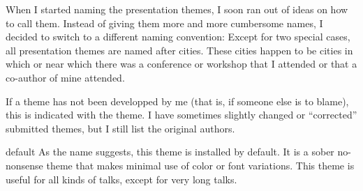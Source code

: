 When I started naming the presentation themes, I soon ran out of ideas on how to call them. Instead of giving them more and more cumbersome names, I decided to switch to a different naming convention: Except for two special cases, all presentation themes are named after cities. These cities happen to be cities in which or near which there was a conference or workshop that I attended or that a co-author of mine attended.

If a theme has not been developped by me (that is, if someone else is to blame), this is indicated with the theme. I have sometimes slightly changed or ``corrected'' submitted themes, but I still list the original authors.

\begin{themeexample}{default}
  As the name suggests, this theme is installed by default. It is a sober no-nonsense theme that makes minimal use of color or font variations. This theme is useful for all kinds of talks, except for very long talks.
\end{themeexample}

